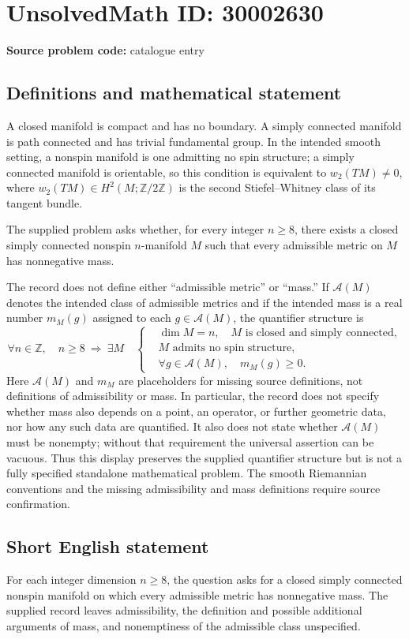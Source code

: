 \documentclass[11pt]{article}
\newcommand{\Z}{\mathbb{Z}}
\begin{document}
\section*{UnsolvedMath ID: 30002630}
\textbf{Source problem code:} catalogue entry
\subsection{Definitions and mathematical statement}
A closed manifold is compact and has no boundary. A simply connected manifold is path connected and has trivial fundamental group. In the intended smooth setting, a nonspin manifold is one admitting no spin structure; a simply connected manifold is orientable, so this condition is equivalent to \(w_2(TM)\ne 0\), where \(w_2(TM)\in H^2(M;\Z/2\Z)\) is the second Stiefel--Whitney class of its tangent bundle.

The supplied problem asks whether, for every integer \(n\geq 8\), there exists a closed simply connected nonspin \(n\)-manifold \(M\) such that every admissible metric on \(M\) has nonnegative mass.

The record does not define either ``admissible metric'' or ``mass.'' If \(\mathcal A(M)\) denotes the intended class of admissible metrics and if the intended mass is a real number \(m_M(g)\) assigned to each \(g\in\mathcal A(M)\), the quantifier structure is
\[
\forall n\in\Z,\quad n\geq 8\ \Longrightarrow\
\exists M\quad
\left\{
\begin{aligned}
&\dim M=n,\quad M\text{ is closed and simply connected},\\
&M\text{ admits no spin structure},\\
&\forall g\in\mathcal A(M),\quad m_M(g)\geq 0.
\end{aligned}
\right.
\]
Here \(\mathcal A(M)\) and \(m_M\) are placeholders for missing source definitions, not definitions of admissibility or mass. In particular, the record does not specify whether mass also depends on a point, an operator, or further geometric data, nor how any such data are quantified. It also does not state whether \(\mathcal A(M)\) must be nonempty; without that requirement the universal assertion can be vacuous. Thus this display preserves the supplied quantifier structure but is not a fully specified standalone mathematical problem. The smooth Riemannian conventions and the missing admissibility and mass definitions require source confirmation.
\subsection{Short English statement}
For each integer dimension \(n\geq 8\), the question asks for a closed simply connected nonspin manifold on which every admissible metric has nonnegative mass. The supplied record leaves admissibility, the definition and possible additional arguments of mass, and nonemptiness of the admissible class unspecified.
\end{document}
